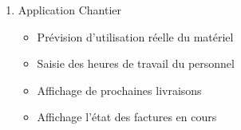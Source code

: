\documentclass [a4paper] {report}
\begin{document}
\begin{enumerate}
\item Application Chantier
\begin{itemize}
\item Prévision d'utilisation réelle du matériel
\item Saisie des heures de travail du personnel
\item Affichage de prochaines livraisons
\item Affichage l'état des factures en cours
\end{itemize}

\end{enumerate}
\end{document}
